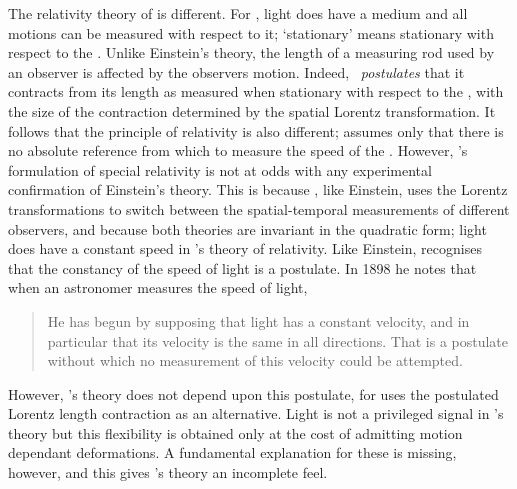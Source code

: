The relativity theory of \Poincare is different.
For \Poincare, light does have a medium and all motions can be  measured with respect to it;
`stationary' means stationary with respect to the \aether\cite{Poincare1908,PoincareScienceAndMethod,Pierseaux2005}.
Unlike Einstein's theory, the length of a measuring rod used by an observer is affected by the observers motion.
Indeed, \Poincare\ {\em postulates} that it contracts from its  length as measured when stationary with respect to the \aether,
with the size of the contraction  determined by the spatial Lorentz transformation\cite{Poincare1906, Pierseaux2005}.
It follows that the principle of relativity  is also different;
\Poincare assumes only that there is no absolute reference from  which to measure the speed of the \aether\cite{Poincare1906}.
However, \Poincare's formulation of special relativity is not at odds with any experimental confirmation of Einstein's theory\cite{Pierseaux2001}.
This is because \Poincare, like Einstein, uses the Lorentz transformations to switch between the spatial-temporal measurements of different observers,
and because both theories are invariant in  the quadratic form;
light does have a constant speed in  \Poincare's theory of relativity\cite{Pierseaux2001}.
Like Einstein, \Poincare recognises that the constancy of the speed of light is a postulate.
In 1898\cite{Poincare1898} he notes that when an astronomer measures the speed of light, 
\blockquote{He has begun by supposing that light has a constant velocity, 
  and in particular that its velocity is the same in all directions. 
  That is a postulate without which no measurement of this velocity could be attempted.%
}
However, \Poincare's  theory does not depend upon this postulate,
for \Poincare uses the postulated Lorentz length contraction as an alternative\cite{Pierseaux2005}.
Light is not a privileged signal in \Poincare's theory
but this flexibility is obtained only at the cost of admitting  motion dependant deformations.
A fundamental explanation for these is  missing, however,
and this gives \Poincare's theory an incomplete feel.

